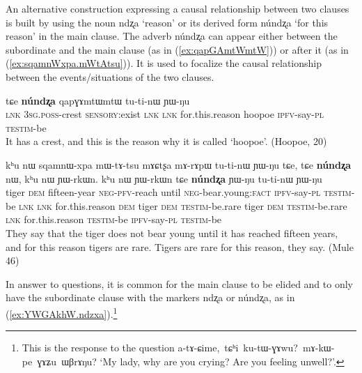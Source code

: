 \documentclass[oldfontcommands,oneside,a4paper,11pt]{article}
\newcommand{\ipa}[1]{{\phon \mbox{#1}}} %
\newcommand{\refb}[1]{(\ref{#1})}
\begin{document}
An alternative construction expressing a causal relationship between two clauses  is built by using the  noun  \ipa{ndʐa} `reason' or its derived form \ipa{núndʐa} `for this reason' in the main clause. The adverb \ipa{núndʐa} can appear either between the subordinate and  the main clause (as in \refb{ex:qapGAmtWmtW}) or after it (as in \refb{ex:sqamnWxpa.mWtAtsu}). It is used to focalize the causal relationship between the events/situations of the two clauses.  

\begin{exe}
\ex \label{ex:qapGAmtWmtW}
\gll
[\ipa{tɕe}  	\ipa{ɯ-mtɯ}  	\ipa{ɣɤʑu}]  	\ipa{tɕe,}  	\ipa{tɕe}  	\textbf{\ipa{núndʐa}}  	\ipa{qapɣɤmtɯmtɯ}  	\ipa{tu-ti-nɯ}  	\ipa{ɲɯ-ŋu}   \\
\textsc{lnk} \textsc{3sg.poss}-crest \textsc{sensory}:exist \textsc{lnk} \textsc{lnk} for.this.reason hoopoe \textsc{ipfv}-say-\textsc{pl} \textsc{testim}-be \\
\glt It has a crest, and this is the reason why it is called `hoopoe'. (Hoopoe, 20)
\end{exe}


\begin{exe}
\ex \label{ex:sqamnWxpa.mWtAtsu}
\gll
\ipa{kʰu}  	\ipa{nɯ}  	\ipa{sqamnɯ-xpa}  	\ipa{mɯ-tɤ-tsu}  	\ipa{mɤɕtʂa}  	\ipa{mɤ-rɤpɯ}  	\ipa{tu-ti-nɯ}  	\ipa{ɲɯ-ŋu}  	\ipa{tɕe,}  	\ipa{tɕe}  	\textbf{\ipa{núndʐa}}  	\ipa{nɯ,}  	\ipa{kʰu}  	\ipa{nɯ}  	\ipa{ɲɯ-rkɯn.}  	\ipa{kʰu}  	\ipa{nɯ}  	\ipa{ɲɯ-rkɯn}  	\ipa{tɕe}  	\textbf{\ipa{núndʐa}}  	\ipa{ɲɯ-ŋu}  	\ipa{tu-ti-nɯ}  	\ipa{ɲɯ-ŋu}  \\
tiger \textsc{dem} fifteen-year \textsc{neg-pfv}-reach until \textsc{neg}-bear.young:\textsc{fact} \textsc{ipfv}-say-\textsc{pl} \textsc{testim}-be \textsc{lnk} \textsc{lnk} for.this.reason \textsc{dem} tiger \textsc{dem} \textsc{testim}-be.rare tiger \textsc{dem} \textsc{testim}-be.rare \textsc{lnk} for.this.reason \textsc{testim}-be \textsc{ipfv}-say-\textsc{pl} \textsc{testim}-be
\\
\glt They say that the tiger does not bear young until it has reached fifteen years, and for this reason tigers are rare. Tigers are rare for this reason, they say. (Mule 46)
\end{exe} 
In answer to questions, it is common for the main clause to be elided and to only have the subordinate clause with the markers \ipa{ndʐa} or \ipa{núndʐa}, as in \refb{ex:YWGAkhW.ndzxa}.\footnote{This is the response to the question \ipa{a-tɤ-ɕime, tɕʰi ku-tɯ-ɣɤwu? mɤ-kɯ-pe ɣɤʑu ɯβrɤŋu?} `My lady, why are you crying? Are you feeling unwell?'.}
\end{document}
